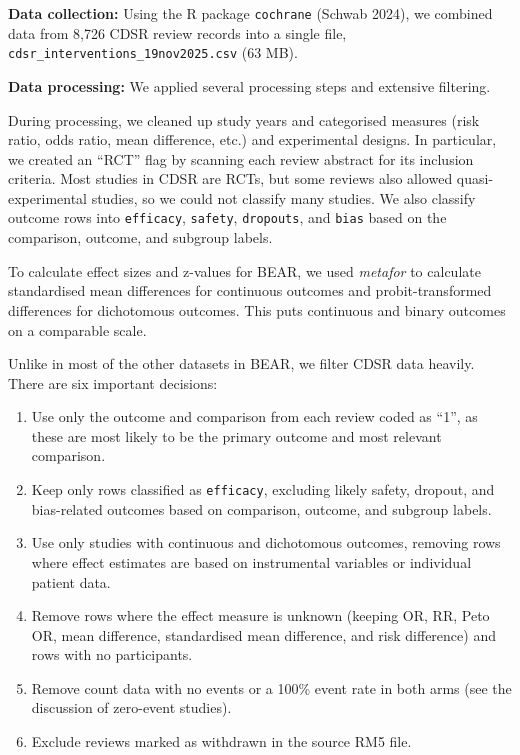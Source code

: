 \documentclass[
  11pt,
]{article}
\providecommand{\tightlist}{%
  \setlength{\itemsep}{0pt}\setlength{\parskip}{0pt}}
\begin{document}
\textbf{Data collection:} Using the R package \texttt{cochrane} (Schwab
2024), we combined data from 8,726 CDSR review records into a single
file, \texttt{cdsr\_interventions\_19nov2025.csv} (63 MB).

\textbf{Data processing:} We applied several processing steps and
extensive filtering.

During processing, we cleaned up study years and categorised measures
(risk ratio, odds ratio, mean difference, etc.) and experimental
designs. In particular, we created an ``RCT'' flag by scanning each
review abstract for its inclusion criteria. Most studies in CDSR are
RCTs, but some reviews also allowed quasi-experimental studies, so we
could not classify many studies. We also classify outcome rows into
\texttt{efficacy}, \texttt{safety}, \texttt{dropouts}, and \texttt{bias}
based on the comparison, outcome, and subgroup labels.

To calculate effect sizes and z-values for BEAR, we used \emph{metafor}
to calculate standardised mean differences for continuous outcomes and
probit-transformed differences for dichotomous outcomes. This puts
continuous and binary outcomes on a comparable scale.

Unlike in most of the other datasets in BEAR, we filter CDSR data
heavily. There are six important decisions:

\begin{enumerate}
\def\labelenumi{\arabic{enumi}.}
\tightlist
\item
  Use only the outcome and comparison from each review coded as ``1'',
  as these are most likely to be the primary outcome and most relevant
  comparison.
\item
  Keep only rows classified as \texttt{efficacy}, excluding likely
  safety, dropout, and bias-related outcomes based on comparison,
  outcome, and subgroup labels.
\item
  Use only studies with continuous and dichotomous outcomes, removing
  rows where effect estimates are based on instrumental variables or
  individual patient data.
\item
  Remove rows where the effect measure is unknown (keeping OR, RR, Peto
  OR, mean difference, standardised mean difference, and risk
  difference) and rows with no participants.
\item
  Remove count data with no events or a 100\% event rate in both arms
  (see the discussion of zero-event studies).
\item
  Exclude reviews marked as withdrawn in the source RM5 file.
\end{enumerate}
\end{document}
